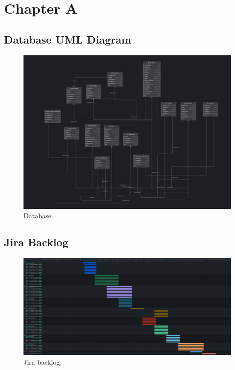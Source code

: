 \chapter{Chapter A}\label{app:AA}
\section{Database UML Diagram}\label{uml}
\begin{figure}[H]\label{fig:database}
  \centering
  \includegraphics[width=0.8\linewidth]{figures/Database.jpg}
  \caption{Database.}
\end{figure}
\section{Jira Backlog}\label{backlog}
\begin{figure}[H]\label{fig:jira}
  \centering
  \includegraphics[width=0.8\linewidth]{figures/skill_swap_development____crowd_funding_platform_2024-04-28_03.06pm.png}
  \caption{Jira backlog.}
\end{figure}
